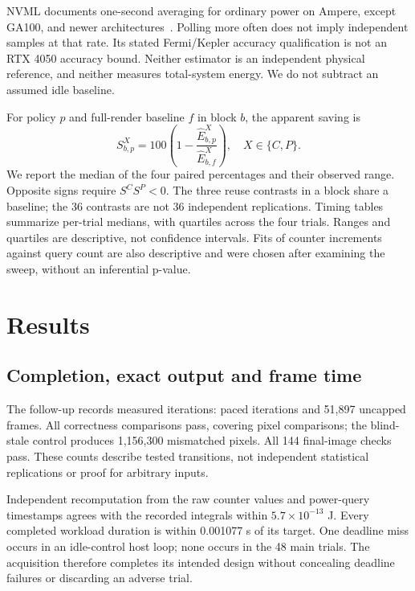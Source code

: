 \documentclass[10pt,conference]{IEEEtran}
\begin{document}
NVML documents one-second averaging for ordinary power on Ampere, except GA100, and newer architectures~\cite{nvml}. Polling more often does not imply independent samples at that rate. Its stated Fermi/Kepler accuracy qualification is not an RTX 4050 accuracy bound. Neither estimator is an independent physical reference, and neither measures total-system energy. We do not subtract an assumed idle baseline.

For policy $p$ and full-render baseline $f$ in block $b$, the apparent saving is
\begin{equation}
S^X_{b,p}=100\left(1-\frac{\widehat E^X_{b,p}}{\widehat E^X_{b,f}}\right),\quad X\in\{C,P\}.
\end{equation}
We report the median of the four paired percentages and their observed range. Opposite signs require $S^C S^P<0$. The three reuse contrasts in a block share a baseline; the 36 contrasts are not 36 independent replications. Timing tables summarize per-trial medians, with quartiles across the four trials. Ranges and quartiles are descriptive, not confidence intervals. Fits of counter increments against query count are also descriptive and were chosen after examining the sweep, without an inferential p-value.

\section{Results}
\subsection{Completion, exact output and frame time}
The follow-up records \FollowupFrames{} measured iterations: \PacedFrames{} paced iterations and 51,897 uncapped frames. All \FollowupChecks{} correctness comparisons pass, covering \FollowupPixels{} pixel comparisons; the blind-stale control produces 1,156,300 mismatched pixels. All 144 final-image checks pass. These counts describe tested transitions, not independent statistical replications or proof for arbitrary inputs.

Independent recomputation from the raw counter values and power-query timestamps agrees with the recorded integrals within $5.7\times10^{-13}$ J. Every completed workload duration is within 0.001077 s of its target. One deadline miss occurs in an idle-control host loop; none occurs in the 48 main trials. The acquisition therefore completes its intended design without concealing deadline failures or discarding an adverse trial.
\end{document}

